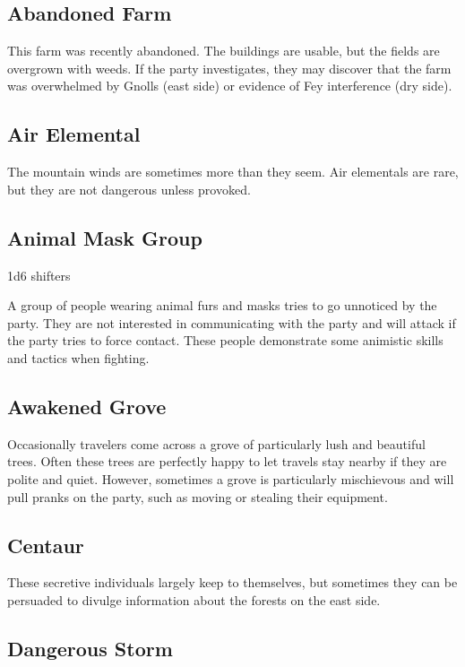 \subsection{Abandoned Farm}

This farm was recently abandoned.
The buildings are usable, but the fields are overgrown with weeds.
If the party investigates, they may discover that the farm was overwhelmed by Gnolls (east side) or evidence of Fey interference (dry side).

\subsection{Air Elemental}

The mountain winds are sometimes more than they seem.
Air elementals are rare, but they are not dangerous unless provoked.

\subsection{Animal Mask Group}

1d6 shifters

A group of people wearing animal furs and masks tries to go unnoticed by the party.
They are not interested in communicating with the party and will attack if the party tries to force contact.
These people demonstrate some animistic skills and tactics when fighting.

\subsection{Awakened Grove}

Occasionally travelers come across a grove of particularly lush and beautiful trees.
Often these trees are perfectly happy to let travels stay nearby if they are polite and quiet.
However, sometimes a grove is particularly mischievous and will pull pranks on the party, such as moving or stealing their equipment.

\subsection{Centaur}

These secretive individuals largely keep to themselves, but sometimes they can be persuaded to divulge information about the forests on the east side.

\subsection{Dangerous Storm}

